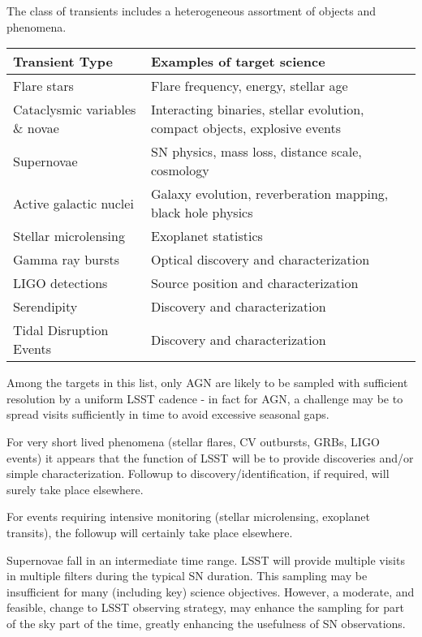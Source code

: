 The class of transients includes a heterogeneous assortment of objects and phenomena.

\begin{center}
\begin{tabular}{| p{5cm} | p{10cm} |}
\hline Transient Type & Examples of target science\\
\hline
Flare stars & Flare frequency, energy, stellar age\\
Cataclysmic variables  \& novae & Interacting binaries, stellar evolution, compact objects, explosive events\\
Supernovae & SN physics, mass loss, distance scale, cosmology\\
Active galactic nuclei & Galaxy evolution, reverberation mapping, black hole physics\\
Stellar microlensing & Exoplanet statistics\\
Gamma ray bursts & Optical discovery and characterization\\
LIGO detections & Source position and characterization\\
Serendipity & Discovery and characterization\\
Tidal Disruption Events & Discovery and characterization\\
 \hline \end{tabular}
 \end{center}

Among the targets in this list, only AGN are likely to be sampled with sufficient resolution by a uniform LSST cadence - in fact for AGN, a challenge may be to spread visits sufficiently in time to avoid excessive seasonal gaps.

For very short lived phenomena (stellar flares, CV outbursts, GRBs, LIGO events) it appears that the function of LSST will be to provide discoveries and/or simple characterization.  Followup to discovery/identification, if required, will surely take place elsewhere.

For events requiring intensive monitoring (stellar microlensing, exoplanet transits), the followup will certainly take place elsewhere.

Supernovae fall in an intermediate time range.  LSST will provide multiple visits in multiple filters during the typical SN duration.  This sampling may be insufficient for many (including key) science objectives.  However, a moderate, and feasible, change to LSST observing strategy, may enhance the sampling for part of the sky part of the time, greatly enhancing the usefulness of SN observations.

